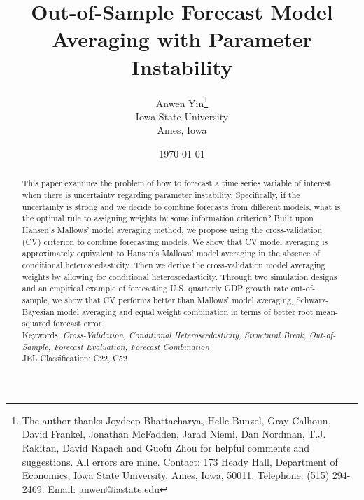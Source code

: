 \newtheorem{theorem}{Theorem}[section]
\newtheorem{lemma}[theorem]{Lemma}
\newtheorem{proposition}[theorem]{Proposition}
\newtheorem{corollary}[theorem]{Corollary}
\newtheorem{Assumption}{Assumption}

\title{Out-of-Sample Forecast Model Averaging with Parameter Instability}
\author{Anwen Yin\thanks{The author thanks Joydeep Bhattacharya, Helle Bunzel, Gray Calhoun, David Frankel, Jonathan McFadden, Jarad Niemi, Dan Nordman, T.J. Rakitan, David Rapach and Guofu Zhou for helpful comments and suggestions. All errors are mine. Contact: 173 Heady Hall, Department of Economics, Iowa State University, Ames, Iowa, 50011. Telephone: (515) 294-2469. Email: \href{mailto:anwen@iastate.edu}{anwen@iastate.edu}} \\ Iowa State University\\Ames, Iowa}
\date{\today}

\maketitle

\begin{abstract}
  \noindent This paper examines the problem of how to forecast a time series variable of interest when there is uncertainty regarding parameter instability. Specifically, if the uncertainty is strong and we decide to combine forecasts from different models, what is the optimal rule to assigning weights by some information criterion? Built upon Hansen's Mallows' model averaging method, we propose using the cross-validation (CV) criterion to combine forecasting models. We show that CV model averaging is approximately equivalent to Hansen's Mallows' model averaging in the absence of conditional heteroscedasticity. Then we derive the cross-validation model averaging weights by allowing for conditional heteroscedasticity. Through two simulation designs and an empirical example of forecasting U.S. quarterly GDP growth rate out-of-sample, we show that CV performs better than Mallows' model averaging, Schwarz-Bayesian model averaging and equal weight combination in terms of better root mean-squared forecast error.\\

  \noindent Keywords: \emph{Cross-Validation, Conditional Heteroscedasticity, Structural Break, Out-of-Sample, Forecast Evaluation, Forecast Combination}\\

  \noindent \textsc{JEL} Classification: C22, C52
\end{abstract}
\newpage
\doublespacing
